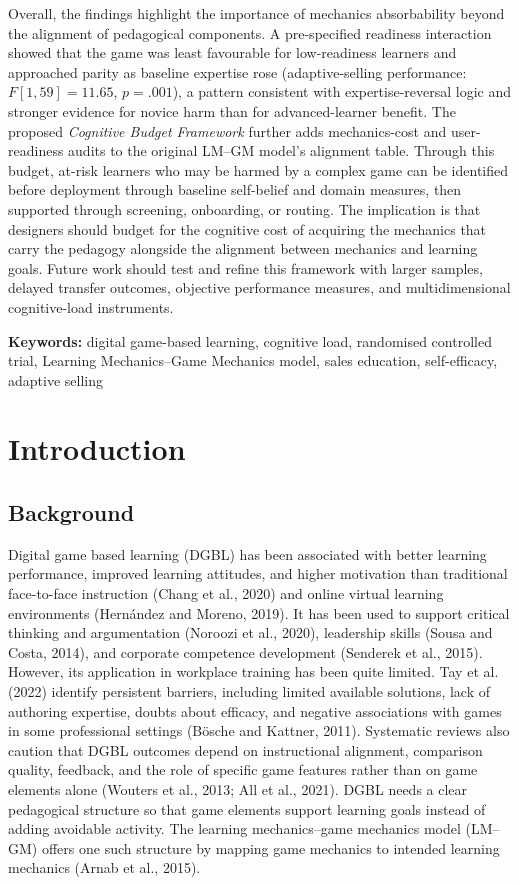 \documentclass[12pt]{report}
\begin{document}
Overall, the findings highlight the importance of mechanics absorbability beyond the alignment of pedagogical components. A pre-specified readiness interaction showed that the game was least favourable for low-readiness learners and approached parity as baseline expertise rose (adaptive-selling performance: $F[1,59] = 11.65$, $p = .001$), a pattern consistent with expertise-reversal logic and stronger evidence for novice harm than for advanced-learner benefit. The proposed \textit{Cognitive Budget Framework} further adds mechanics-cost and user-readiness audits to the original LM--GM model's alignment table. Through this budget, at-risk learners who may be harmed by a complex game can be identified before deployment through baseline self-belief and domain measures, then supported through screening, onboarding, or routing. The implication is that designers should budget for the cognitive cost of acquiring the mechanics that carry the pedagogy alongside the alignment between mechanics and learning goals. Future work should test and refine this framework with larger samples, delayed transfer outcomes, objective performance measures, and multidimensional cognitive-load instruments.

\textbf{Keywords:} digital game-based learning, cognitive load, randomised controlled trial, Learning Mechanics--Game Mechanics model, sales education, self-efficacy, adaptive selling

\clearpage

\tableofcontents
\listoftables
\clearpage
{}
\chapter{Introduction}

\section{Background}
Digital game based learning (DGBL) has been associated with better learning performance, improved learning attitudes, and higher motivation than traditional face-to-face instruction (Chang et al., 2020) and online virtual learning environments (Hern\'andez and Moreno, 2019). It has been used to support critical thinking and argumentation (Noroozi et al., 2020), leadership skills (Sousa and Costa, 2014), and corporate competence development (Senderek et al., 2015). However, its application in workplace training has been quite limited. Tay et al. (2022) identify persistent barriers, including limited available solutions, lack of authoring expertise, doubts about efficacy, and negative associations with games in some professional settings (B\"osche and Kattner, 2011). Systematic reviews also caution that DGBL outcomes depend on instructional alignment, comparison quality, feedback, and the role of specific game features rather than on game elements alone (Wouters et al., 2013; All et al., 2021). DGBL needs a clear pedagogical structure so that game elements support learning goals instead of adding avoidable activity. The learning mechanics--game mechanics model (LM--GM) offers one such structure by mapping game mechanics to intended learning mechanics (Arnab et al., 2015).
\end{document}
